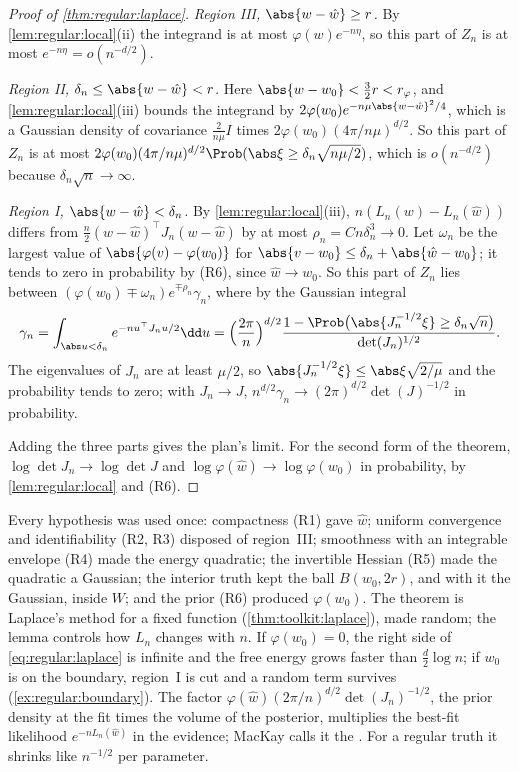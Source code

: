 \begin{refsection}
\begin{proof}[Proof of \cref{thm:regular:laplace}]
\emph{Region III, $\abs{w-\hat w}\ge r$.} By \cref{lem:regular:local}(ii) the integrand is at most $\varphi(w)e^{-n\eta}$, so this part of $Z_n$ is at most $e^{-n\eta}=o(n^{-d/2})$.

\emph{Region II, $\delta_n\le\abs{w-\hat w}<r$.} Here $\abs{w-w_0}<\frac32r<r_\varphi$, and \cref{lem:regular:local}(iii) bounds the integrand by $2\varphi(w_0)e^{-n\mu\abs{w-\hat w}^2/4}$, which is a Gaussian density of covariance $\frac2{n\mu}I$ times $2\varphi(w_0)(4\pi/n\mu)^{d/2}$. So this part of $Z_n$ is at most $2\varphi(w_0)(4\pi/n\mu)^{d/2}\Prob(\abs\xi\ge\delta_n\sqrt{n\mu/2})$, which is $o(n^{-d/2})$ because $\delta_n\sqrt n\to\infty$.

\emph{Region I, $\abs{w-\hat w}<\delta_n$.} By \cref{lem:regular:local}(iii), $n(L_n(w)-L_n(\hat w))$ differs from $\frac n2(w-\hat w)^\top J_n(w-\hat w)$ by at most $\rho_n=Cn\delta_n^3\to0$. Let $\omega_n$ be the largest value of $\abs{\varphi(v)-\varphi(w_0)}$ for $\abs{v-w_0}\le\delta_n+\abs{\hat w-w_0}$; it tends to zero in probability by (R6), since $\hat w\to w_0$. So this part of $Z_n$ lies between $(\varphi(w_0)\mp\omega_n)e^{\mp\rho_n}\gamma_n$, where by the Gaussian integral
\[
\gamma_n=\int_{\abs u<\delta_n}e^{-nu^\top J_nu/2}\dd u=\Bigl(\frac{2\pi}n\Bigr)^{d/2}\frac{1-\Prob\bigl(\abs{J_n^{-1/2}\xi}\ge\delta_n\sqrt n\bigr)}{\det(J_n)^{1/2}} .
\]
The eigenvalues of $J_n$ are at least $\mu/2$, so $\abs{J_n^{-1/2}\xi}\le\abs\xi\sqrt{2/\mu}$ and the probability tends to zero; with $J_n\to J$, $n^{d/2}\gamma_n\to(2\pi)^{d/2}\det(J)^{-1/2}$ in probability.

Adding the three parts gives the plan's limit. For the second form of the theorem, $\log\det J_n\to\log\det J$ and $\log\varphi(\hat w)\to\log\varphi(w_0)$ in probability, by \cref{lem:regular:local} and (R6).
\end{proof}

Every hypothesis was used once: compactness (R1) gave $\hat w$; uniform convergence and identifiability (R2, R3) disposed of region~III; smoothness with an integrable envelope (R4) made the energy quadratic; the invertible Hessian (R5) made the quadratic a Gaussian; the interior truth kept the ball $B(w_0,2r)$, and with it the Gaussian, inside $W$; and the prior (R6) produced $\varphi(w_0)$. The theorem is Laplace's method for a fixed function (\cref{thm:toolkit:laplace}), made random; the lemma controls how $L_n$ changes with $n$. If $\varphi(w_0)=0$, the right side of \eqref{eq:regular:laplace} is infinite and the free energy grows faster than $\frac d2\log n$; if $w_0$ is on the boundary, region~I is cut and a random term survives (\cref{ex:regular:boundary}). The factor $\varphi(\hat w)(2\pi/n)^{d/2}\det(J_n)^{-1/2}$, the prior density at the fit times the volume of the posterior, multiplies the best-fit likelihood $e^{-nL_n(\hat w)}$ in the evidence; MacKay calls it the  \parencite[Chapter~28]{MacKay2003}. For a regular truth it shrinks like $n^{-1/2}$ per parameter.


\end{refsection}
